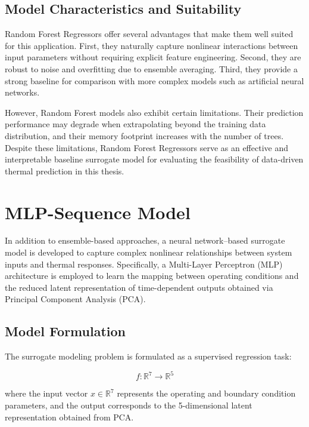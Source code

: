 \subsection{Model Characteristics and Suitability}
Random Forest Regressors offer several advantages that make them well suited for this application. First, they naturally capture nonlinear interactions between input parameters without requiring explicit feature engineering. Second, they are robust to noise and overfitting due to ensemble averaging. Third, they provide a strong baseline for comparison with more complex models such as artificial neural networks.

However, Random Forest models also exhibit certain limitations. Their prediction performance may degrade when extrapolating beyond the training data distribution, and their memory footprint increases with the number of trees. Despite these limitations, Random Forest Regressors serve as an effective and interpretable baseline surrogate model for evaluating the feasibility of data-driven thermal prediction in this thesis.


\newpage
\section{MLP-Sequence Model}

In addition to ensemble-based approaches, a neural network--based surrogate model is developed to capture complex nonlinear relationships between system inputs and thermal responses. Specifically, a Multi-Layer Perceptron (MLP) architecture is employed to learn the mapping between operating conditions and the reduced latent representation of time-dependent outputs obtained via Principal Component Analysis (PCA).

\subsection{Model Formulation}

The surrogate modeling problem is formulated as a supervised regression task:

\begin{equation}
f : \mathbb{R}^7 \rightarrow \mathbb{R}^5
\end{equation}

where the input vector $x \in \mathbb{R}^7$ represents the operating and boundary condition parameters, and the output corresponds to the 5-dimensional latent representation obtained from PCA.

